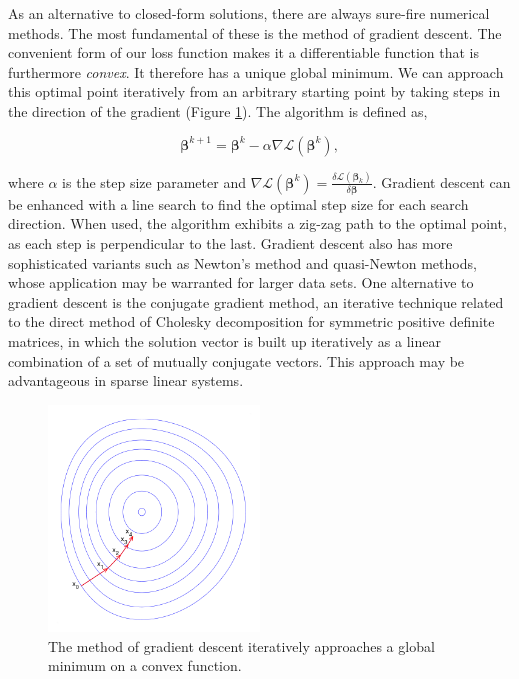 \documentclass[11pt]{amsart}
\begin{document}
As an alternative to closed-form solutions, there are always sure-fire numerical methods. The most fundamental of these is the method of gradient descent. The convenient form of our loss function makes it a differentiable function that is furthermore \emph{convex}. It therefore has a unique global minimum. We can approach this optimal point iteratively from an arbitrary starting point by taking steps in the direction of the gradient (Figure \ref{fig:gradientdescent}). The algorithm is defined as,

$$\boldsymbol\beta^{k+1} = \boldsymbol\beta^{k} - \alpha \nabla\mathcal{L}(\boldsymbol\beta^k),$$

where $\alpha$ is the step size parameter and $\nabla\mathcal{L}(\boldsymbol\beta^k) = \frac{\delta\mathcal{L}(\boldsymbol\beta_k)}{\delta\boldsymbol\beta}$. Gradient descent can be enhanced with a line search to find the optimal step size for each search direction. When used, the algorithm exhibits a zig-zag path to the optimal point, as each step is perpendicular to the last. Gradient descent also has more sophisticated variants such as Newton's method and quasi-Newton methods, whose application may be warranted for larger data sets. One alternative to gradient descent is the conjugate gradient method, an iterative technique related to the direct method of Cholesky decomposition for symmetric positive definite matrices, in which the solution vector is built up iteratively as a linear combination of a set of mutually conjugate vectors. This approach may be advantageous in sparse linear systems.

\begin{figure}[!ht]
\centering
\includegraphics[width=0.5\textwidth]{Figures/gradientdescent.png}
\caption{The method of gradient descent iteratively approaches a global minimum on a convex function.\cite{gradientdescent}}
\label{fig:gradientdescent}
\end{figure}
\end{document}
